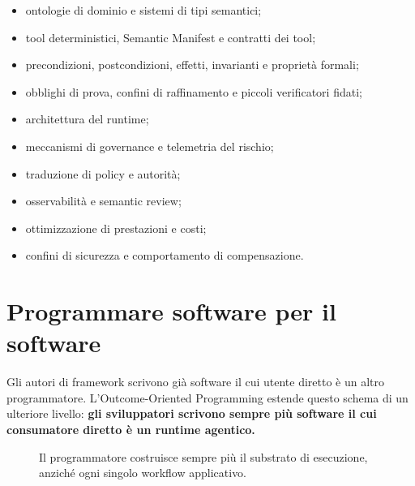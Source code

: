 \documentclass[10pt,oneside,openany]{book}
\begin{document}
\begin{itemize}
\item ontologie di dominio e sistemi di tipi semantici;
\item tool deterministici, Semantic Manifest e contratti dei tool;
\item precondizioni, postcondizioni, effetti, invarianti e proprietà formali;
\item obblighi di prova, confini di raffinamento e piccoli verificatori fidati;
\item architettura del runtime;
\item meccanismi di governance e telemetria del rischio;
\item traduzione di policy e autorità;
\item osservabilità e semantic review;
\item ottimizzazione di prestazioni e costi;
\item confini di sicurezza e comportamento di compensazione.
\end{itemize}

\section{Programmare software per il software}
Gli autori di framework scrivono già software il cui utente diretto è un altro programmatore. L'Outcome-Oriented Programming estende questo schema di un ulteriore livello: \textbf{gli sviluppatori scrivono sempre più software il cui consumatore diretto è un runtime agentico.}

\begin{figure}[ht]
\centering
{}
\caption{Il programmatore costruisce sempre più il substrato di esecuzione, anziché ogni singolo workflow applicativo.}
\end{figure}
\end{document}
